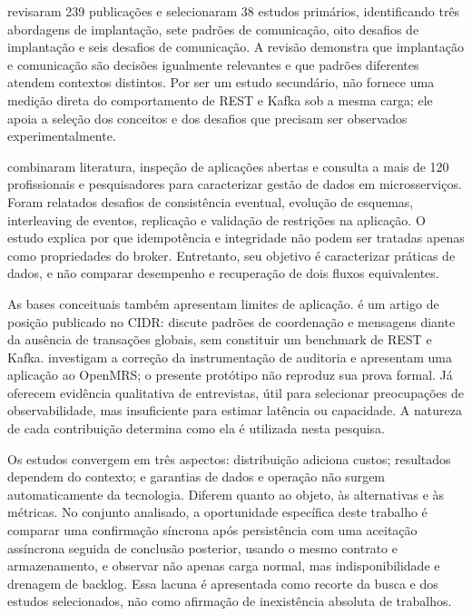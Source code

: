  revisaram 239 publicações e selecionaram 38 estudos primários, identificando três abordagens de implantação, sete padrões de comunicação, oito desafios de implantação e seis desafios de comunicação. A revisão demonstra que implantação e comunicação são decisões igualmente relevantes e que padrões diferentes atendem contextos distintos. Por ser um estudo secundário, não fornece uma medição direta do comportamento de REST e Kafka sob a mesma carga; ele apoia a seleção dos conceitos e dos desafios que precisam ser observados experimentalmente.

 combinaram literatura, inspeção de aplicações abertas e consulta a mais de 120 profissionais e pesquisadores para caracterizar gestão de dados em microsserviços. Foram relatados desafios de consistência eventual, evolução de esquemas, interleaving de eventos, replicação e validação de restrições na aplicação. O estudo explica por que idempotência e integridade não podem ser tratadas apenas como propriedades do broker. Entretanto, seu objetivo é caracterizar práticas de dados, e não comparar desempenho e recuperação de dois fluxos equivalentes.

As bases conceituais também apresentam limites de aplicação.  é um artigo de posição publicado no CIDR: discute padrões de coordenação e mensagens diante da ausência de transações globais, sem constituir um benchmark de REST e Kafka.  investigam a correção da instrumentação de auditoria e apresentam uma aplicação ao OpenMRS; o presente protótipo não reproduz sua prova formal. Já  oferecem evidência qualitativa de entrevistas, útil para selecionar preocupações de observabilidade, mas insuficiente para estimar latência ou capacidade. A natureza de cada contribuição determina como ela é utilizada nesta pesquisa.

Os estudos convergem em três aspectos: distribuição adiciona custos; resultados dependem do contexto; e garantias de dados e operação não surgem automaticamente da tecnologia. Diferem quanto ao objeto, às alternativas e às métricas. No conjunto analisado, a oportunidade específica deste trabalho é comparar uma confirmação síncrona após persistência com uma aceitação assíncrona seguida de conclusão posterior, usando o mesmo contrato e armazenamento, e observar não apenas carga normal, mas indisponibilidade e drenagem de backlog. Essa lacuna é apresentada como recorte da busca e dos estudos selecionados, não como afirmação de inexistência absoluta de trabalhos.

